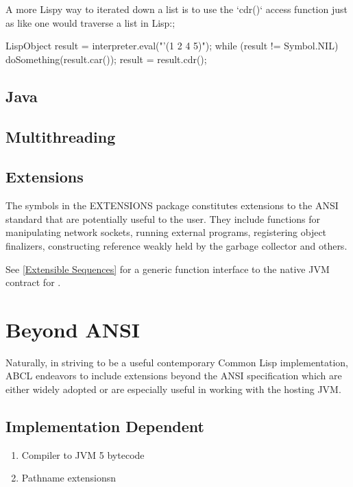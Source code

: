 \documentclass[10pt]{book}
\begin{document}
A more Lispy way to iterated down a list is to use the `cdr()` access
function just as like one would traverse a list in Lisp:;

\begin{listing-java}
    LispObject result = interpreter.eval("'(1 2 4 5)");
    while (result != Symbol.NIL) {
      doSomething(result.car());
      result = result.cdr();
    }
\end{listing-java}


\section{Java}



\section{Multithreading}



\section{Extensions}

The symbols in the EXTENSIONS package constitutes extensions to the
ANSI standard that are potentially useful to the user.  They include
functions for manipulating network sockets, running external programs,
registering object finalizers, constructing reference weakly held by
the garbage collector and others.

See \ref{Extensible Sequences} for a generic function interface to
the native JVM contract for .



\chapter{Beyond ANSI}

Naturally, in striving to be a useful contemporary Common Lisp
implementation, ABCL endeavors to include extensions beyond the ANSI
specification which are either widely adopted or are especially useful
in working with the hosting JVM.

\section{Implementation Dependent}
\begin{enumerate}
  \item Compiler to JVM 5 bytecode
  \item Pathname extensionsn
\end{enumerate}
\end{document}

